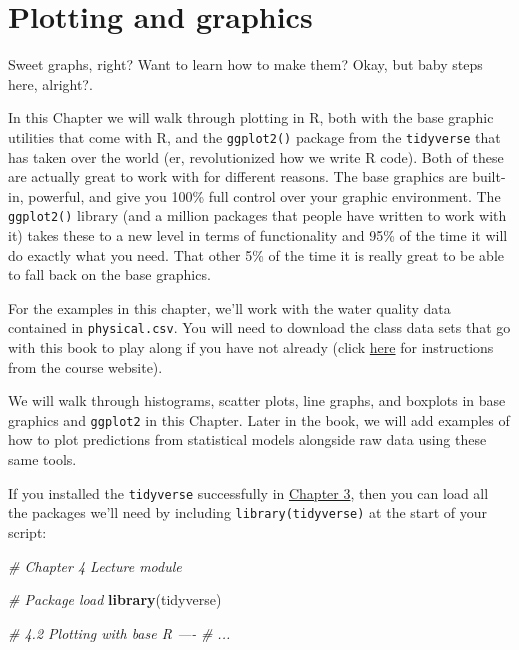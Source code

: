 \documentclass[
]{book}
\newenvironment{Shaded}{\begin{snugshade}}{\end{snugshade}}
\newcommand{\CommentTok}[1]{\textcolor[rgb]{0.56,0.35,0.01}{\textit{#1}}}
\newcommand{\KeywordTok}[1]{\textcolor[rgb]{0.13,0.29,0.53}{\textbf{#1}}}
\newcommand{\NormalTok}[1]{#1}
\begin{document}
\hypertarget{Chapter4}{%
\chapter{Plotting and graphics}\label{Chapter4}}

Sweet graphs, right? Want to learn how to make them? Okay, but baby steps here, alright?.

In this Chapter we will walk through plotting in R, both with the base graphic utilities that come with R, and the \texttt{ggplot2()} package from the \texttt{tidyverse} that has taken over the world (er, revolutionized how we write R code). Both of these are actually great to work with for different reasons. The base graphics are built-in, powerful, and give you 100\% full control over your graphic environment. The \texttt{ggplot2()} library (and a million packages that people have written to work with it) takes these to a new level in terms of functionality and 95\% of the time it will do exactly what you need. That other 5\% of the time it is really great to be able to fall back on the base graphics.

For the examples in this chapter, we'll work with the water quality data contained in \texttt{physical.csv}. You will need to download the class data sets that go with this book to play along if you have not already (click \href{https://danstich.github.io/stich/classes/BIOL217/software.html}{here} for instructions from the course website).

We will walk through histograms, scatter plots, line graphs, and boxplots in base graphics and \texttt{ggplot2} in this Chapter. Later in the book, we will add examples of how to plot predictions from statistical models alongside raw data using these same tools.

If you installed the \texttt{tidyverse} successfully in \protect\hyperlink{tidyverse}{Chapter 3}, then you can load all the packages we'll need by including \texttt{library(tidyverse)} at the start of your script:

\begin{Shaded}
\begin{Highlighting}[]
\CommentTok{# Chapter 4 Lecture module}

\CommentTok{# Package load}
\KeywordTok{library}\NormalTok{(tidyverse) }

\CommentTok{# 4.2 Plotting with base R ----}
\CommentTok{# ...}
\end{Highlighting}
\end{Shaded}
\end{document}
